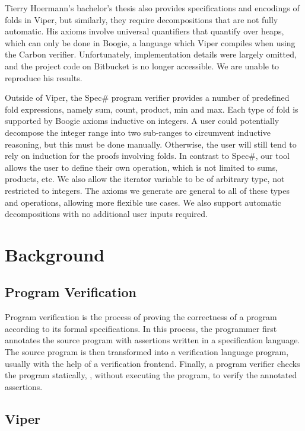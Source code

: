 \documentclass[msc,oneside]{ubcthesis}
\theoremstyle{definition}
\begin{document}
Tierry Hoermann’s bachelor’s thesis also provides specifications and encodings of folds in Viper, but similarly, they require decompositions that are not fully automatic. His axioms involve universal quantifiers that quantify over heaps, which can only be done in Boogie, a language which Viper compiles when using the Carbon verifier. 
Unfortunately, implementation details were largely omitted, and the project code on Bitbucket is no longer accessible. We are unable to reproduce his results.
	
Outside of Viper, the Spec\# program verifier provides a number of predefined fold expressions, namely sum, count, product, min and max. Each type of fold is supported by Boogie axioms inductive on integers. 
A user could potentially decompose the integer range into two sub-ranges to circumvent inductive reasoning, but this must be done manually. 
Otherwise, the user will still tend to rely on induction for the proofs involving folds. In contrast to Spec\#, our tool allows the user to define their own operation, which is not limited to sums, products, etc. We also allow the iterator variable to be of arbitrary type, not restricted to integers. The axioms we generate are general to all of these types and operations, allowing more flexible use cases. We also support automatic decompositions with no additional user inputs required.

\newpage

\chapter{Background}

\section{Program Verification}

Program verification is the process of proving the correctness of a program according to its formal specifications. In this process, the programmer first annotates the source program with assertions written in a specification language. The source program is then transformed into a verification language program, usually with the help of a verification frontend. Finally, a program verifier checks the program statically, \ie, without executing the program, to verify the annotated assertions.

\section{Viper}
\end{document}
